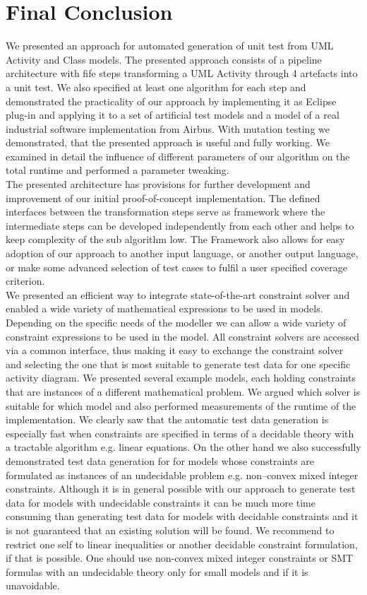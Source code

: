 \section{Final Conclusion}
We presented an approach for automated generation of unit test from UML Activity and Class models. The presented approach consists of a pipeline architecture with fife steps transforming a UML Activity through 4 artefacts into a unit test. We also specified at least one algorithm for each step and demonstrated the practicality of our approach by implementing it as Eclipse plug-in and applying it to a set of artificial test models and a model of a real industrial software implementation from Airbus. With mutation testing we demonstrated, that the presented approach is useful and fully working. We examined in detail the influence of different parameters of our algorithm on the total runtime and performed a parameter tweaking.\\
The presented architecture has provisions for further development and improvement of our initial proof-of-concept implementation. The defined interfaces between the transformation steps serve as framework where the intermediate steps can be developed independently from each other and helps to keep complexity of the sub algorithm low. The Framework also allows for easy adoption of our approach to another input language, or another output language, or make some advanced selection of test cases to fulfil a user specified coverage criterion.\\
We presented an efficient way to integrate state-of-the-art constraint solver and enabled a wide variety of mathematical expressions to be used in models. Depending on the specific needs of the modeller we can allow a wide variety of constraint expressions to be used in the model. All constraint solvers are accessed via a common interface, thus making it easy to exchange the constraint solver and selecting the one that is most suitable to generate test data for one specific activity diagram. We presented several example models, each holding constraints that are instances of a different mathematical problem. We argued which solver is suitable for which model and also performed measurements of the runtime of the implementation. We clearly saw that the automatic test data generation is especially fast when constraints are specified in terms of a decidable theory with a tractable algorithm e.g. linear equations. On the other hand we also successfully demonstrated test data generation for for models whose constraints are formulated as instances of an undecidable problem e.g. non--convex mixed integer constraints. Although it is in general possible with our approach to generate test data for models with undecidable constraints it can be much more time consuming than generating test data for models with decidable constraints and it is not guaranteed that an existing solution will be found. We recommend to restrict one self to linear inequalities or another decidable constraint formulation, if that is possible. One should use non-convex mixed integer constraints or SMT formulas with an undecidable theory only for small models and if it is unavoidable.\\
